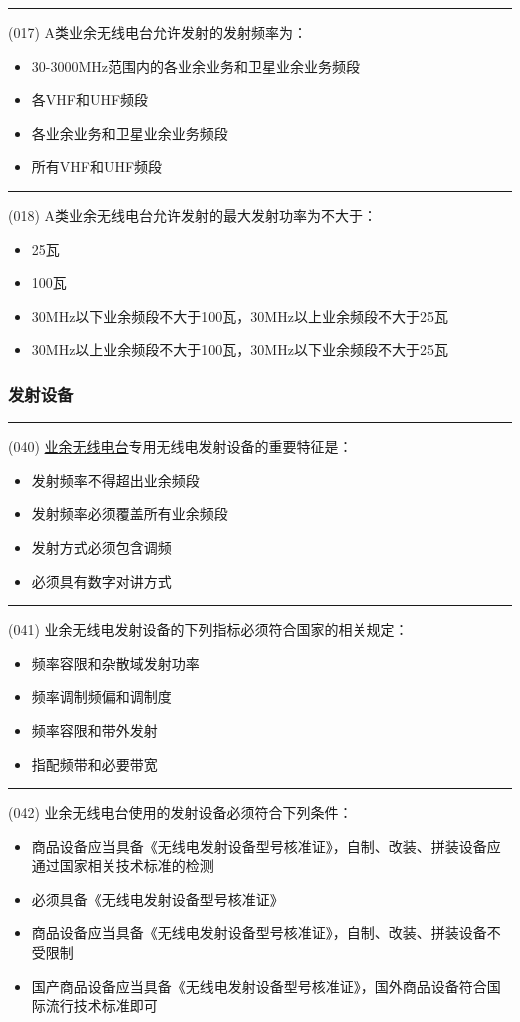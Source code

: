 \documentclass[twocolumn,hyperref,UTF8]{ctexart}  %
\begin{document}
\noindent\rule{0.5\textwidth}{1pt}
\heiti (017) A类业余无线电台允许发射的发射频率为： \songti {\color{gray} [LK0014] }
\begin{itemize}
	\item  30-3000MHz范围内的各业余业务和卫星业余业务频段
	\item  各VHF和UHF频段
	\item  各业余业务和卫星业余业务频段
	\item  所有VHF和UHF频段
\end{itemize}


\noindent\rule{0.5\textwidth}{1pt}
\heiti (018) A类业余无线电台允许发射的最大发射功率为不大于： \songti {\color{gray} [LK0017] }
\begin{itemize}
	\item  25瓦
	\item  100瓦
	\item  30MHz以下业余频段不大于100瓦，30MHz以上业余频段不大于25瓦
	\item  30MHz以上业余频段不大于100瓦，30MHz以下业余频段不大于25瓦
\end{itemize}


\subsubsection{发射设备}


\noindent\rule{0.5\textwidth}{1pt}
\heiti (040) \underline{业余无线电台}{\color{cyan}专用}无线电发射设备的重要特征是： \songti {\color{gray} [LK0024] }
\begin{itemize}
	\item  发射频率不得超出业余频段
	\item  发射频率必须覆盖所有业余频段
	\item  发射方式必须包含调频
	\item  必须具有数字对讲方式
\end{itemize}


\noindent\rule{0.5\textwidth}{1pt}
\heiti (041) 业余无线电发射设备的下列指标必须符合国家的相关规定： \songti {\color{gray} [LK0025] }
\begin{itemize}
	\item  频率容限和杂散域发射功率
	\item  频率调制频偏和调制度
	\item  频率容限和带外发射
	\item  指配频带和必要带宽
\end{itemize}


\noindent\rule{0.5\textwidth}{1pt}
\heiti (042) 业余无线电台使用的发射设备必须符合下列条件： \songti {\color{gray} [LK0038] }
\begin{itemize}
	\item  商品设备应当具备《无线电发射设备型号核准证》，自制、改装、拼装设备应通过国家相关技术标准的检测
	\item  必须具备《无线电发射设备型号核准证》
	\item  商品设备应当具备《无线电发射设备型号核准证》，自制、改装、拼装设备不受限制
	\item  国产商品设备应当具备《无线电发射设备型号核准证》，国外商品设备符合国际流行技术标准即可
\end{itemize}
\end{document}
